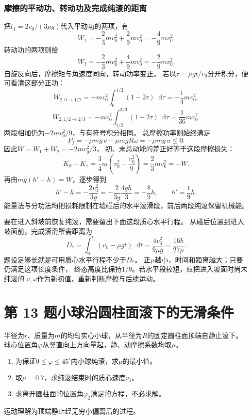 \documentclass[UTF8,fontset=fandol,a4paper,11pt]{ctexart}
\newcommand{\dd}{\mathop{}\!\mathrm{d}}
\newcommand{\tagline}[1]{\noindent{\small\color{muted}#1}\par}
\begin{document}
\subsubsection*{摩擦的平动功、转动功及完成纯滚的距离}
把$t_1=2v_0/(3\mu g)$代入平动功的两项，有
\[
W_1=-\frac23mv_0^2+\frac29mv_0^2
=-\frac49mv_0^2.
\]
转动功的两项则给
\[
W_2=-\frac23mv_0^2+\frac49mv_0^2
=-\frac29mv_0^2.
\]
自旋反向后，摩擦矩与角速度同向，转动功率变正。
若以$\tau=\mu gt/v_0$分开积分，便可看清这部分正功：
\[
W_{2,0\to1/2}=-mv_0^2\int_0^{1/2}(1-2\tau)\dd\tau
=-\frac14mv_0^2,
\]
\[
W_{2,1/2\to2/3}=-mv_0^2\int_{1/2}^{2/3}(1-2\tau)\dd\tau
=\frac1{36}mv_0^2.
\]
两段相加仍为$-2mv_0^2/9$，与有符号积分相同。
总摩擦功率则始终满足
\[
P_f=-\mu mg\,v-\mu mgR\omega=-\mu mg\,u\leq0.
\]
因此$W=W_1+W_2=-2mv_0^2/3$，
初、末总动能的差正好等于这段摩擦损失：
\[
K_0-K_1=\frac34m\left(v_0^2-\frac{v_0^2}{9}\right)
=\frac23mv_0^2=-W.
\]
再由$mg(h'-h)=W$，逐步得到
\[
h'-h=-\frac{2v_0^2}{3g}
=-\frac{2}{3g}\frac{4gh}{3}
=-\frac89h,
\qquad h'=\frac19h.
\]
能量法与分功法均把损耗限制在墙碰后的水平滚滑段，前后两段纯滚保留机械能。

要在进入斜坡前恢复纯滚，需要留出下面这段质心水平行程。
从碰后位置到进入坡面前，完成滚滑所需距离为
\[
D_* =\int_0^{t_1}(v_0-\mu gt)\dd t
=\frac{4v_0^2}{9\mu g}=\frac{16h}{27\mu}.
\]
题设足够长就是可用质心水平行程不少于$D_*$。
正$\mu$越小，时间和距离越大；只要仍满足这项长度条件，
终态高度比保持$1/9$。若水平段较短，应把进入坡面时尚未纯滚的
$v,\omega$作为新初值，重新判断摩擦与后续运动。




\section*{第 13 题\quad 小球沿圆柱面滚下的无滑条件}

\tagline{M-06-13}

半径为$r$、质量为$m$的均匀实心小球，从半径为$R$的固定圆柱面顶端自静止滚下。
球心位置角$\varphi$从竖直向上方向量起，静、动摩擦系数均取$\mu$。
\begin{enumerate}
\item 为保证$0\leq\varphi\leq45^\circ$内小球纯滚，求$\mu$的最小值。
\item 取$\mu=0.7$，求纯滚结束时的质心速度$v_1$。
\item 求离开圆柱面的位置角$\varphi_2$满足的方程，不必求解。
\end{enumerate}
运动理解为顶端静止经无穷小偏离后的过程。
\end{document}
